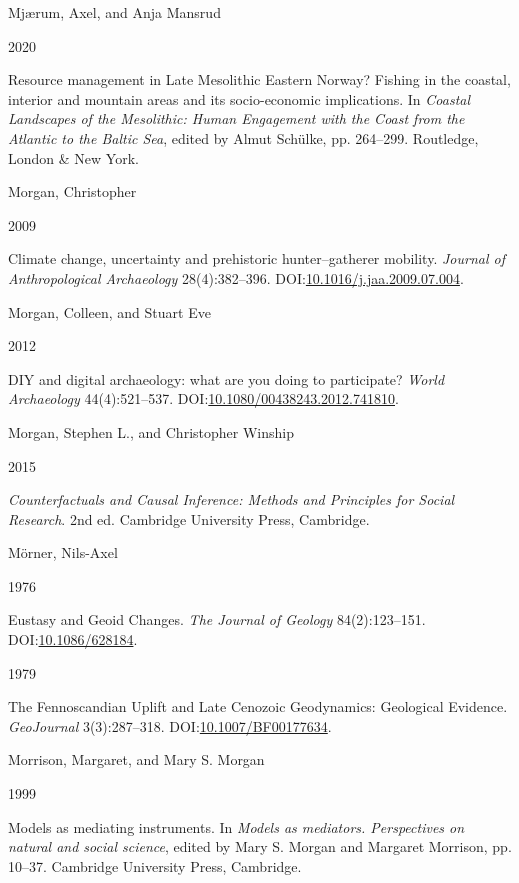 \documentclass[
  12pt,
  a4paper,
  oneside]{book}
\newlength{\cslhangindent}
\newlength{\csllabelwidth}
\newlength{\cslentryspacingunit} %
\newenvironment{CSLReferences}[2] %
 {%
  \setlength{\parindent}{0pt}
  \ifodd #1
  \let\oldpar\par
  \def\par{\hangindent=\cslhangindent\oldpar}
  \fi
  \setlength{\parskip}{#2\cslentryspacingunit}
 }%
 {}
\newcommand{\CSLBlock}[1]{#1\hfill\break}
\newcommand{\CSLLeftMargin}[1]{\parbox[t]{\csllabelwidth}{#1}}
\newcommand{\CSLRightInline}[1]{\parbox[t]{\linewidth - \csllabelwidth}{#1}\break}
\begin{document}
\begin{CSLReferences}{0}{0}
\leavevmode{}%
\CSLBlock{Mjærum, Axel, and Anja Mansrud}
\CSLLeftMargin{ 2020}
\CSLRightInline{{Resource management in Late Mesolithic Eastern Norway? Fishing in the coastal, interior and mountain areas and its socio-economic implications}. In \emph{{Coastal Landscapes of the Mesolithic: Human Engagement with the Coast from the Atlantic to the Baltic Sea}}, edited by Almut Schülke, pp. 264--299. Routledge, London \& New York.}

\leavevmode{}%
\CSLBlock{Morgan, Christopher}
\CSLLeftMargin{ 2009}
\CSLRightInline{Climate change, uncertainty and prehistoric hunter--gatherer mobility. \emph{Journal of Anthropological Archaeology} 28(4):382--396. DOI:\href{https://doi.org/10.1016/j.jaa.2009.07.004}{10.1016/j.jaa.2009.07.004}.}

\leavevmode{}%
\CSLBlock{Morgan, Colleen, and Stuart Eve}
\CSLLeftMargin{ 2012}
\CSLRightInline{{DIY and digital archaeology: what are you doing to participate?} \emph{World Archaeology} 44(4):521--537. DOI:\href{https://doi.org/10.1080/00438243.2012.741810}{10.1080/00438243.2012.741810}.}

\leavevmode{}%
\CSLBlock{Morgan, Stephen L., and Christopher Winship}
\CSLLeftMargin{ 2015}
\CSLRightInline{\emph{{Counterfactuals and Causal Inference: Methods and Principles for Social Research}}. 2nd ed. Cambridge University Press, Cambridge.}

\leavevmode{}%
\CSLBlock{Mörner, Nils-Axel}
\CSLLeftMargin{ 1976}
\CSLRightInline{{Eustasy and Geoid Changes}. \emph{The Journal of Geology} 84(2):123--151. DOI:\href{https://doi.org/10.1086/628184}{10.1086/628184}.}

\leavevmode{}%
\CSLLeftMargin{ 1979 }
\CSLRightInline{{The Fennoscandian Uplift and Late Cenozoic Geodynamics: Geological Evidence}. \emph{GeoJournal} 3(3):287--318. DOI:\href{https://doi.org/10.1007/BF00177634}{10.1007/BF00177634}.}

\leavevmode{}%
\CSLBlock{Morrison, Margaret, and Mary S. Morgan}
\CSLLeftMargin{ 1999}
\CSLRightInline{Models as mediating instruments. In \emph{Models as mediators. Perspectives on natural and social science}, edited by Mary S. Morgan and Margaret Morrison, pp. 10--37. Cambridge University Press, Cambridge.}


\end{CSLReferences}
\end{document}
